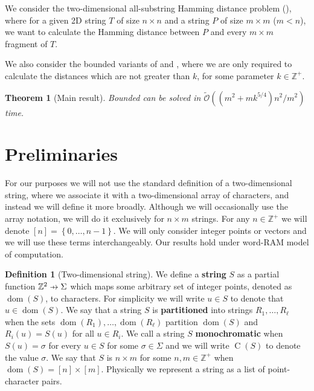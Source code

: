 \documentclass[11pt]{article}
\newcommand{\Z}{\mathbb{Z}}
\newcommand{\tO}{\tilde{\mathcal{O}}}
\newcommand{\set}[1]{\left\lbrace #1 \right\rbrace}
\theoremstyle{plain}
\newtheorem{theorem}{Theorem}
\theoremstyle{definition}
\newtheorem{definition}{Definition}
\theoremstyle{remark}
\DeclareMathOperator*{\dom}{dom}
\DeclareMathOperator*{\charrr}{C}
\begin{document}
We consider the two-dimensional all-substring Hamming distance problem (\HD), where for a given 2D string $T$ of size $n \times n$ and a string $P$ of size $m \times m$ ($m < n$), we want to calculate the Hamming distance between $P$ and every $m \times m$ fragment of $T$.

We also consider the bounded variants of \hd and \HD, where we are only required to calculate the distances which are not greater than $k$, for some parameter $k \in \Z^+$.


\begin{theorem}[Main result]\label{main result}
	Bounded \HD can be solved in $\tO((m^2 + mk^{5/4})n^2 / m^2)$ time.
\end{theorem}


\section{Preliminaries}

For our purposes we will not use the standard definition of a two-dimensional string, where we associate it with a two-dimensional array of characters, and instead we will define it more broadly.
Although we will occasionally use the array notation, we will do it exclusively for $n \times m$ strings.
For any $n \in \Z^+$ we will denote $[n] = \set{0, \dots, n - 1}$.
We will only consider integer points or vectors and we will use these terms interchangeably.
Our results hold under word-RAM model of computation.

\newcommand{\getchar}[1]{\charrr(#1)}
\newcommand{\pto}{\mathrel{\ooalign{\hfil$\mapstochar\mkern5mu$\hfil\cr$\to$\cr}}}
\renewcommand{\d}[1]{\dom(#1)}
\newcommand{\f}[1]{#1^\mathbf{f}}
\begin{definition}[Two-dimensional string]
	We define a \textbf{string} $S$ as a partial function $\Z^2 \pto \Sigma$ which maps some arbitrary set of integer points, denoted as $\d{S}$, to characters.
	For simplicity we will write $u \in S$ to denote that $u \in \d{S}$.
	We say that a string $S$ is \textbf{partitioned} into strings $R_1, \dots, R_\ell$ when the sets $\d{R_1}, \dots, \d{R_\ell}$ partition $\d{S}$ and $R_i(u) = S(u)$ for all $u \in R_i$.
	We call a string $S$ \textbf{monochromatic} when $S(u) = \sigma$ for every $u \in S$ for some $\sigma \in \Sigma$ and we will write $\getchar{S}$ to denote the value $\sigma$.
	We say that $S$ is $n \times m$ for some $n, m \in \Z^+$ when $\d{S} = [n] \times [m]$.
	Physically we represent a string as a list of point-character pairs.
\end{definition}
\end{document}

